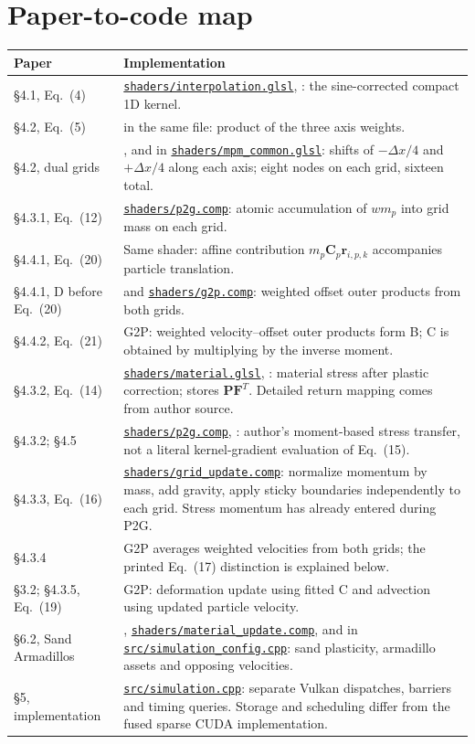 \documentclass[11pt,a4paper]{article}
\newcommand{\code}[1]{\texttt{\detokenize{#1}}}
\newcommand{\src}[1]{\href{../../#1}{\nolinkurl{#1}}}
\newcommand{\mat}[1]{\mathbf{#1}}
\begin{document}
\section{Paper-to-code map}
\begin{longtable}{>{\raggedright\arraybackslash}p{.22\linewidth}>{\raggedright\arraybackslash}p{.69\linewidth}}
\toprule Paper & Implementation \\\midrule\endhead
\S4.1, Eq.~(4) & \src{shaders/interpolation.glsl}, \code{interpolation()}: the sine-corrected compact 1D kernel. \\
\S4.2, Eq.~(5) & \code{kernelWeight()} in the same file: product of the three axis weights. \\
\S4.2, dual grids & \code{interpolation()}, \code{nodeOffset()} and \code{nodeIndex()} in \src{shaders/mpm_common.glsl}: shifts of $-\Delta x/4$ and $+\Delta x/4$ along each axis; eight nodes on each grid, sixteen total. \\
\S4.3.1, Eq.~(12) & \src{shaders/p2g.comp}: atomic accumulation of $w m_p$ into grid mass on each grid. \\
\S4.4.1, Eq.~(20) & Same shader: affine contribution $m_p\mat{C}_p\mat{r}_{i,p,k}$ accompanies particle translation. \\
\S4.4.1, D before Eq.~(20) & \code{inverseMoment()} and \src{shaders/g2p.comp}: weighted offset outer products from both grids. \\
\S4.4.2, Eq.~(21) & G2P: weighted velocity--offset outer products form B; C is obtained by multiplying by the inverse moment. \\
\S4.3.2, Eq.~(14) & \src{shaders/material.glsl}, \code{sandMaterial()}: material stress after plastic correction; stores $\mat{P}\mat{F}^{T}$. Detailed return mapping comes from author source. \\
\S4.3.2; \S4.5 & \src{shaders/p2g.comp}, \code{contribution}: author's moment-based stress transfer, not a literal kernel-gradient evaluation of Eq.~(15). \\
\S4.3.3, Eq.~(16) & \src{shaders/grid_update.comp}: normalize momentum by mass, add gravity, apply sticky boundaries independently to each grid. Stress momentum has already entered during P2G. \\
\S4.3.4 & G2P averages weighted velocities from both grids; the printed Eq.~(17) distinction is explained below. \\
\S3.2; \S4.3.5, Eq.~(19) & G2P: deformation update using fitted C and advection using updated particle velocity. \\
\S6.2, Sand Armadillos & \code{sandMaterial()}, \src{shaders/material_update.comp}, and \code{loadParticles()} in \src{src/simulation_config.cpp}: sand plasticity, armadillo assets and opposing velocities. \\
\S5, implementation & \src{src/simulation.cpp}: separate Vulkan dispatches, barriers and timing queries. Storage and scheduling differ from the fused sparse CUDA implementation. \\\bottomrule
\end{longtable}
\end{document}
